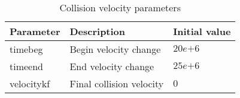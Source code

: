\begin{table}[H]
\small
\centering
\begin{tabular}{l l l}
\toprule
Parameter & Description & Initial value \\
\midrule
timebeg 	& Begin velocity change & $20e{+6}$\\
timeend 	& End velocity change & $25e{+6}$\\
velocitykf 	& Final collision velocity & $0$\\
\bottomrule
\end{tabular}
\caption{Collision velocity parameters}
\label{tbl:mode_collision_parameters}
\end{table}